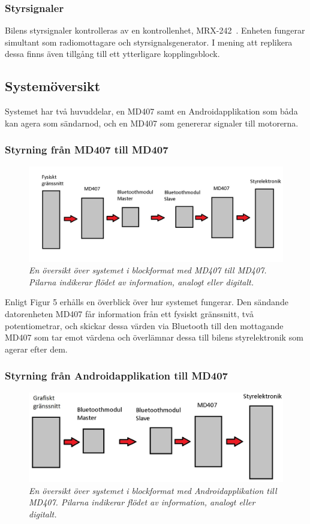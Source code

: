 \documentclass[a4paper]{article}
\begin{document}
\subsubsection{Styrsignaler}
Bilens styrsignaler kontrolleras av en kontrollenhet, MRX-242~\cite{projektDir}. Enheten fungerar simultant som radiomottagare och styrsignalsgenerator. I mening att replikera dessa finns även tillgång till ett ytterligare kopplingsblock.


\subsection{Systemöversikt}
Systemet har två huvuddelar, en MD407 samt en Androidapplikation som båda kan agera som sändarnod, och en MD407 som genererar signaler till motorerna.

\subsubsection{Styrning från MD407 till MD407}
\begin{figure}[H]
\includegraphics[width=\textwidth]{systemoversikt.jpg}
\centering
\caption{\it En översikt över systemet i blockformat med MD407 till MD407. Pilarna indikerar flödet av information, analogt eller digitalt.}
\end{figure} 


Enligt Figur 5 erhålls en överblick över hur systemet fungerar. Den sändande datorenheten MD407 får information från ett fysiskt gränssnitt, två potentiometrar, och skickar dessa värden via Bluetooth till den mottagande MD407 som tar emot värdena och överlämnar dessa till bilens styrelektronik som agerar efter dem.

\subsubsection{Styrning från Androidapplikation till MD407}
\begin{figure}[H]
\includegraphics[width=\textwidth]{systemoversiktAndroid.jpg}
\centering
\caption{\it En översikt över systemet i blockformat med Androidapplikation till MD407. Pilarna indikerar flödet av information, analogt eller digitalt.}
\end{figure} 
\end{document}
